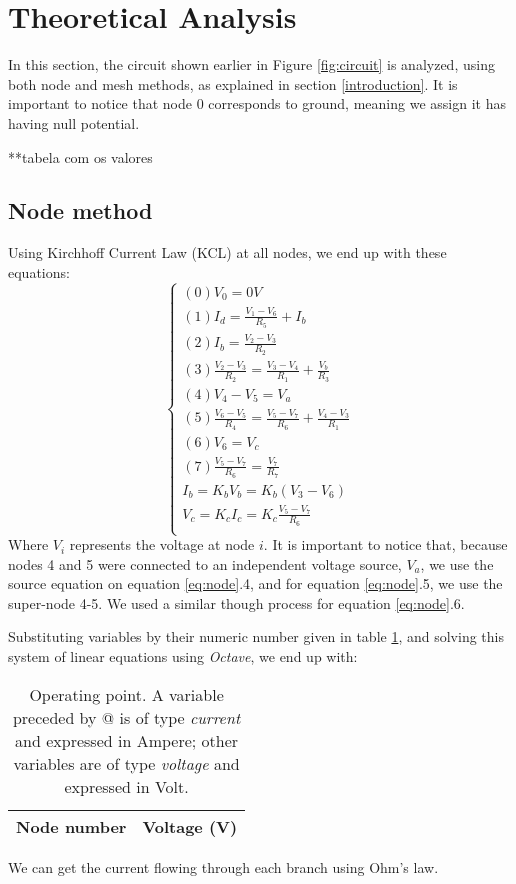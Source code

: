 \section{Theoretical Analysis}
\label{sec:analysis}

In this section, the circuit shown earlier in Figure \ref{fig:circuit} is analyzed, using both node and mesh methods, as explained in section \ref{introduction}. It is important to notice that node 0 corresponds to ground, meaning we assign it has having null potential.
\par
**tabela com os valores

\subsection{Node method}
Using Kirchhoff Current Law (KCL) at all nodes, we end up with these equations:
\begin{equation}\label{eq:node}
  \begin{cases}
  (0) V_0 = 0V \\
  (1) I_d = \frac{V_1 - V_6}{R_5} + I_b \\
  (2) I_b = \frac{V_2 - V_3}{R_2} \\
  (3) \frac{V_2 - V_3}{R_2} = \frac{V_3 - V_4}{R_1} + \frac{V_b}{R_3} \\
  (4) V_4 - V_5 = V_a \\
  (5) \frac{V_6 - V_5}{R_4} = \frac{V_5 - V_7}{R_6} + \frac{V_4 - V_3}{R_1} \\ %
  (6) V_6 = V_c \\
  (7) \frac{V_5 - V_7}{R_6} = \frac{V_7}{R_7} \\
  I_b = K_bV_b = K_b(V_3 - V_6) \\
  V_c = K_cI_c = K_c \frac{V_5 - V_7}{R_6} \\
\end{cases}
\end{equation}
Where $V_i$ represents the voltage at node $i$. It is important to notice that, because nodes 4 and 5 were connected to an independent voltage source, $V_a$, we use the source equation on equation \ref{eq:node}.4, and for equation \ref{eq:node}.5, we use the super-node 4-5. We used a similar though process for equation \ref{eq:node}.6.
\par
Substituting variables by their numeric number given in table \ref{tab:node}, and solving this system of linear equations using \textit{Octave}, we end up with:
\begin{table}[h]
  \centering
  \begin{tabular}{|l|r|}
    \hline    
    {\bf Node number} & {\bf Voltage (V)} \\ \hline
    
  \end{tabular}
  \caption{Operating point. A variable preceded by @ is of type {\em current}
    and expressed in Ampere; other variables are of type {\it voltage} and expressed in
    Volt.}
  \label{tab:node}
\end{table}
\par
We can get the current flowing through each branch using Ohm's law.

